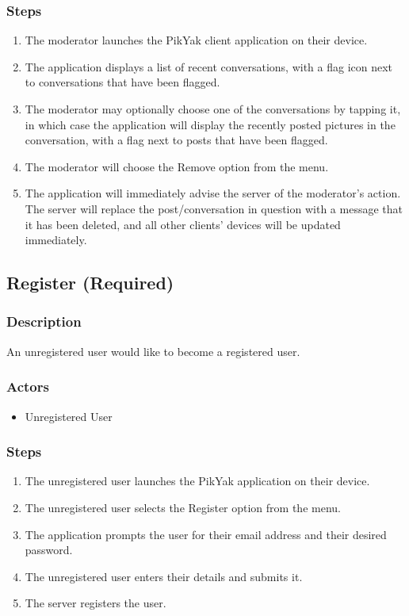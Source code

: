 \documentclass[11pt]{scrartcl}
\begin{document}
        \subsubsection{Steps}
            \begin{enumerate}
                \item The moderator launches the PikYak client application on their device.
                \item The application displays a list of recent conversations, with a flag icon next to conversations that have been flagged.
                \item The moderator may optionally choose one of the conversations by tapping it, in which case the application will display the recently posted pictures in the conversation, with a flag next to posts that have been flagged.
                \item The moderator will choose the Remove option from the menu.
                \item The application will immediately advise the server of the moderator's action.  The server will replace the post/conversation in question with a message that it has been deleted, and all other clients' devices will be updated immediately.
            \end{enumerate}

    \subsection{Register (Required)}
    \label{sec:register}
        \subsubsection{Description}
            An unregistered user would like to become a registered user.
        \subsubsection{Actors}
            \begin{itemize}
                \item Unregistered User
            \end{itemize}
        \subsubsection{Steps}
            \begin{enumerate}
                \item The unregistered user launches the PikYak application on their device.
                \item The unregistered user selects the Register option from the menu.
                \item The application prompts the user for their email address and their desired password.
                \item The unregistered user enters their details and submits it.
                \item The server registers the user.
            \end{enumerate}
\end{document}
